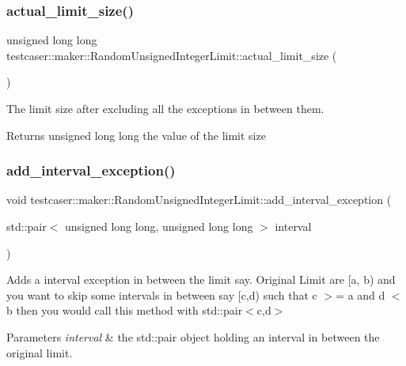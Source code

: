\subsubsection{\texorpdfstring{actual\_limit\_size()}{actual\_limit\_size()}}
{\footnotesize\ttfamily unsigned long long testcaser\+::maker\+::\+Random\+Unsigned\+Integer\+Limit\+::actual\+\_\+limit\+\_\+size (\begin{DoxyParamCaption}{ }\end{DoxyParamCaption})\hspace{0.3cm}{\ttfamily [inline]}}



The limit size after excluding all the exceptions in between them. 

\begin{DoxyReturn}{Returns}
unsigned long long the value of the limit size 
\end{DoxyReturn}
\mbox{\label{classtestcaser_1_1maker_1_1RandomUnsignedIntegerLimit_a979b5384118ab1f3c20366ae3e9bff7a}} 
\subsubsection{\texorpdfstring{add\_interval\_exception()}{add\_interval\_exception()}}
{\footnotesize\ttfamily void testcaser\+::maker\+::\+Random\+Unsigned\+Integer\+Limit\+::add\+\_\+interval\+\_\+exception (\begin{DoxyParamCaption}\item[{std\+::pair$<$ unsigned long long, unsigned long long $>$}]{interval }\end{DoxyParamCaption})\hspace{0.3cm}{\ttfamily [inline]}}



Adds a interval exception in between the limit say. Original Limit are \mbox{[}a, b) and you want to skip some intervals in between say \mbox{[}c,d) such that c $>$= a and d $<$ b then you would call this method with std\+::pair$<$c,d$>$ 


\begin{DoxyParams}{Parameters}
{\em interval} & the std\+::pair object holding an interval in between the original limit. \\
\hline
\end{DoxyParams}
\mbox{\label{classtestcaser_1_1maker_1_1RandomUnsignedIntegerLimit_af38fd933b010cd1877e012ed40b2cafa}} 
